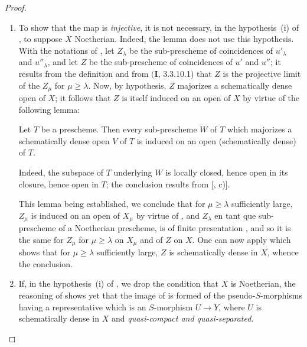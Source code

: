 \begin{proof}
\begin{remarks}[20.3.8.7]
\label{IV.20.3.8.7}
\begin{enumerate}[label=(\roman*)]
  \item To show that the map  is \emph{injective}, it is not necessary, in the hypothesis~(i) of , to suppose $X$ Noetherian.
  Indeed, the lemma  does not use this hypothesis.
  With the notations of , let $Z_\lambda$ be the sub-prescheme of coincidences of $u'_\lambda$ and $u''_\lambda$, and let $Z$ be the sub-prescheme of coincidences of $u'$ and $u''$;
  it results from the definition  and from $(\mathbf{I}$, 3.3.10.1) that $Z$ is the projective limit of the $Z_\mu$ for $\mu\geq\lambda$.
  Now, by hypothesis, $Z$ majorizes a schematically dense open of $X$;
  it follows that $Z$ is itself induced on an open of $X$ by virtue of the following lemma:

\begin{lemma}[20.3.8.8]
\label{IV.20.3.8.8}
Let $T$ be a prescheme.
Then every sub-prescheme $W$ of $T$ which majorizes a schematically dense open $V$ of $T$ is induced on an open (schematically dense) of $T$.
\end{lemma}

  Indeed, the subspace of $T$ underlying $W$ is locally closed, hence open in its closure, hence open in $T$;
  the conclusion results from [, c)].

  This lemma being established, we conclude that for $\mu\geq\lambda$ sufficiently large, $Z_\mu$ is induced on an open of $X_\mu$ by virtue of , and $Z_\lambda$ en tant que sub-prescheme of a Noetherian prescheme, is of finite presentation , and so it is the same for $Z_\mu$ for $\mu\geq\lambda$ on $X_\mu$ and of $Z$ on $X$.
  One can now apply  which shows that for $\mu\geq\lambda$ sufficiently large, $Z$ is schematically dense in $X$, whence the conclusion.

  \item If, in the hypothesis~(i) of , we drop the condition that $X$ is Noetherian, the reasoning of  shows yet that the image of  is formed of the pseudo-$S$-morphisms having a representative which is an $S$-morphism $U\to Y$, where $U$ is schematically dense in $X$ and \emph{quasi-compact and quasi-separated}.
\end{enumerate}
\end{remarks}
\end{proof}

